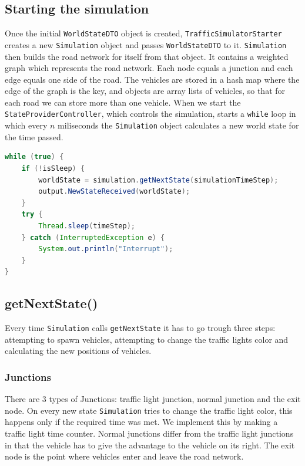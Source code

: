 \documentclass[a4paper,12pt]{article}
\begin{document}
\subsection{Starting the simulation}
Once the initial \verb|WorldStateDTO| object is created,  \verb|TrafficSimulatorStarter|  creates a new \verb|Simulation| object and passes \verb|WorldStateDTO|  to it. \verb|Simulation| then builds the road network for itself from that object. It contains a weighted graph which represents the road network. Each node equals a junction and each edge equals one side of the road. The vehicles are stored in a hash map where the edge of the graph is the key, and objects are array lists of vehicles, so that for each road we can store more than one vehicle.
\newline
When we start the \verb|StateProviderController|, which controls the simulation, starts a \verb|while| loop in which every $n$ miliseconds the \verb|Simulation| object calculates a new world state for the time passed.

\begin{lstlisting}[language=Java]
while (true) {
    if (!isSleep) {
        worldState = simulation.getNextState(simulationTimeStep);
        output.NewStateReceived(worldState);
    }
    try {
        Thread.sleep(timeStep);
    } catch (InterruptedException e) {
        System.out.println("Interrupt");
    }
}
\end{lstlisting}

\subsection{getNextState()}
Every time \verb|Simulation| calls \verb|getNextState| it has to go trough three steps: attempting to spawn vehicles, attempting to change the traffic lights color and calculating the new positions of vehicles.\newline
\subsubsection{Junctions}
There are 3 types of Junctions: traffic light junction, normal junction and the exit node. On every new state \verb|Simulation| tries to change the traffic light color, this happens only if the required time was met. We implement this by making a traffic light time counter. Normal junctions differ from the traffic light junctions in that the vehicle has to give the advantage to the vehicle on its right. The exit node is the point where vehicles enter and leave the road network.
\newline
\end{document}
